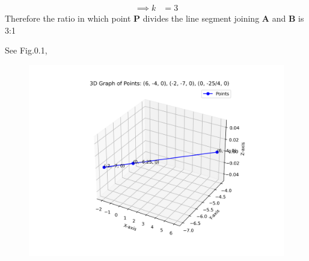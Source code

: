 \documentclass[journal]{IEEEtran}
\begin{document}
\begin{align}
\implies k &= 3
\end{align}
 Therefore the ratio in which point \textbf{P} divides the line segment joining \textbf{A} and \textbf{B} is 3:1

See Fig.0.1,
\begin{figure}[H]
\begin{center}
\includegraphics[width=0.7\columnwidth]{figs/graph3d.png}
\end{center}
\caption{}
\label{fig:fig.py}
\end{figure}
\end{document}
